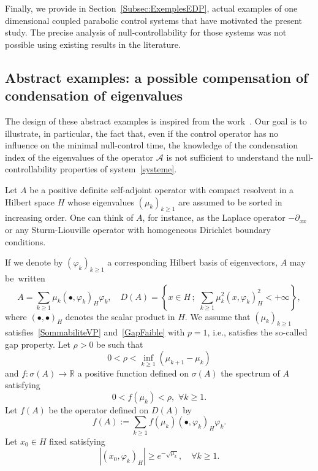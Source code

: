 \documentclass[11pt]{article}
\theoremstyle{definition}
\numberwithin{equation}{section}
\numberwithin{figure}{section}
\numberwithin{table}{section}
\newcommand\A{\mathcal{A}}
\newcommand{\psH}[2]{\left(#1, #2 \right)_H}
\renewcommand{\cdot}{{\scriptstyle \bullet}}
\let\oldforall\forall
\renewcommand*{\forall}{\mathrel{\oldforall}}
\begin{document}
Finally, we provide in Section~\ref{Subsec:ExemplesEDP}, actual examples of one dimensional coupled parabolic control systems that have motivated the present study. The precise analysis of null-controllability for those systems was not possible using existing results in the literature.


\subsection{Abstract examples: a possible compensation of condensation of eigenvalues} \label{Subsec:ExemplesAcademiques}

The design of these abstract examples is inspired from the work~\cite{AKBDK05}. Our goal is to illustrate, in particular, the fact that, even if the control operator has no influence on the minimal null-control time, the knowledge of the condensation index of the eigenvalues of the operator $\A$ is not sufficient to understand the null-controllability properties of system~\eqref{systeme}.

Let $A$ be a positive definite self-adjoint operator with compact resolvent in a Hilbert space $H$ whose eigenvalues $(\mu _{k})_{k \geq 1}$ are assumed to be sorted in increasing order. One can think of $A$, for instance, as the Laplace operator $-\partial_{xx} $ or any Sturm-Liouville operator with homogeneous Dirichlet boundary conditions.

If we denote by $(\varphi _{k})_{k \geq 1}$ a corresponding Hilbert basis of eigenvectors, $A$ may be~written
\begin{equation*}
A=\sum_{k \geq 1} \mu_{k} \psH{\cdot}{\varphi_{k}} \varphi_{k}, \quad D(A)=\left\{x\in H \,;\,\, \sum_{k\geq 1}\mu_k^2 \psH{x}{\varphi_k}^2<+\infty\right\},
\end{equation*}
where $\psH{\cdot}{\cdot}$ denotes the scalar product in $H$. We assume that $(\mu_k)_{k \geq 1}$ satisfies~\eqref{SommabiliteVP} and~\eqref{GapFaible} with $p=1$, i.e., satisfies the so-called gap property. Let $\rho >0$ be such that
\begin{equation}\label{hyporho}
0 < \rho < \inf_{k \geq 1} (\mu_{k+1}- \mu_k)
\end{equation}
and $f:\sigma(A)\rightarrow \mathbb{R}$ a positive function defined on $\sigma(A)$ the spectrum of $A$ satisfying
\begin{equation}\label{hypof}
0<f(\mu_k)<\rho, \,\,\forall k\geq 1.
\end{equation}
Let $f(A)$ be the operator defined on $D(A)$ by
\begin{equation*}
f(A):=\sum_{k\geq 1}f(\mu _{k}) \psH{\cdot}{\varphi _{k} } \varphi _{k}.
\end{equation*}
Let $x_0\in H$ fixed satisfying
\begin{equation}\label{hypox0}
| \psH{x_0}{\varphi_k}| \geq e^{-\sqrt{\mu_k}},\quad \forall k\geq 1.
\end{equation}
\end{document}
